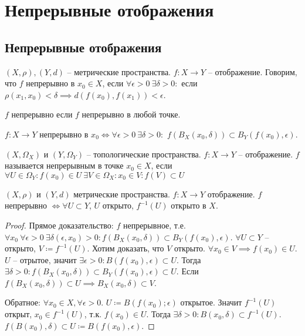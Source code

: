 \documentclass[main]{subfiles}
\begin{document}
\chapter{Непрерывные отображения}
\section{Непрерывные отображения}
\begin{definition}
    $(X, \rho), (Y, d)$ -- метрические пространства. $f: X \to Y$ -- отображение.
    Говорим, что $f$ непрерывно в $x_0 \in X$, если
    $\forall \epsilon > 0\ \exists \delta > 0:$ если $\rho(x_1, x_0) < \delta \implies d(f(x_0), f(x_1)) < \epsilon$.
\end{definition}
\begin{definition}
    $f$ непрерывно если $f$ непрерывно в любой точке.
\end{definition}
\begin{remark}
    $f: X \to Y$ непрерывно в $x_0 \Leftrightarrow \forall \epsilon > 0\ \exists \delta > 0:$
    $f\left(B_X(x_0, \delta)\right) \subset B_Y(f(x_0), \epsilon)$.
\end{remark}

\begin{definition}
    $(X, \Omega_X)$ и $(Y, \Omega_Y)$ -- топологические пространства.
    $f: X \to Y$ -- отображение.
    $f$ называется непрерывным в точке $x_0 \in X$, если $\forall U \in \Omega_Y : f(x_0) \in U\ \exists V \in \Omega_X: x_0 \in V: f(V) \subset U $
\end{definition}

\begin{theorem}
    $(X, \rho)$ и $(Y, d)$ метрические пространства. $f: X \to Y$ отображение.
    $f$ непрерывно $\Leftrightarrow \forall U \subset Y$, $U$ открыто, $f^{-1}(U)$ открыто в $X$.
\end{theorem}
\begin{proof}
    Прямое доказательство: $f$ непрерывное, т.е.
    $\forall x_0\ \forall \epsilon > 0\ \exists \delta(\epsilon, x_0) > 0: f(B_X(x_0, \delta))\subset B_Y (f(x_0), \epsilon)$.
    $\forall U \subset Y$ -- открыто, $V \coloneqq f^{-1}(U)$.
    Хотим доказать, что $V$ открыто. $\forall x_0 \in V \implies f(x_0) \in U$.
    $U$ -- отрытое, значит $\exists \epsilon > 0: B(f(x_0), \epsilon) \subset U$.
    Тогда $\exists \delta > 0: f(B_X(x_0, \delta)) \subset B_Y(f(x_0), \epsilon) \subset U$.
    Если $f(B_X(x_0, \delta)) \subset U \implies B_X(x_0, \delta) \subset V$.

    Обратное: $\forall x_0 \in X, \forall\epsilon >0.$ $U\coloneqq B(f(x_0); \epsilon)$ открытое.
    Значит $f^{-1}(U)$ открыт, $x_0 \in f^{-1}(U)$, т.к. $f(x_0) \in U$.
    Тогда $\exists \delta > 0: B(x_0, \delta) \subset f^{-1}(U)$.
    $f(B(x_0), \delta) \subset U \coloneqq B(f(x_0), \epsilon)$.
\end{proof}
\end{document}
